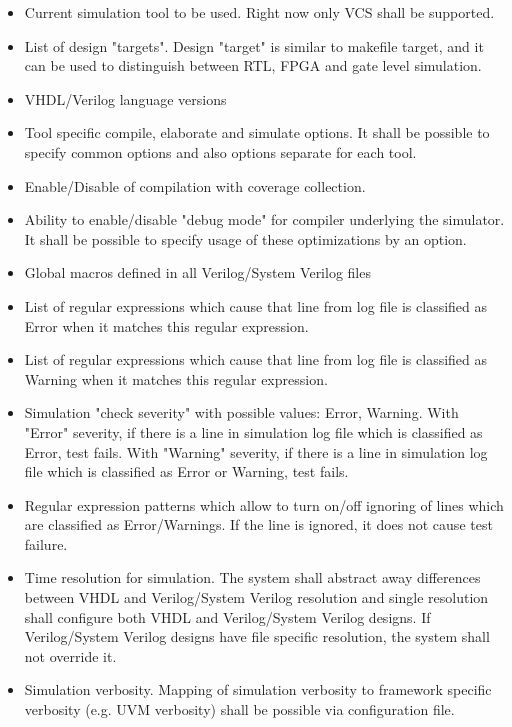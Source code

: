 \documentclass{tropic_design_spec}
\begin{document}
\begin{itemize}
    \item{Current simulation tool to be used. Right now only VCS shall be supported.}
    \item{List of design "targets". Design "target" is similar to makefile target, and
          it can be used to distinguish between RTL, FPGA and gate level simulation.}	
    \item{VHDL/Verilog language versions}
    \item{Tool specific compile, elaborate and simulate options. It shall be possible
          to specify common options and also options separate for each tool.}
    \item{Enable/Disable of compilation with coverage collection.}
    \item{Ability to enable/disable "debug mode" for compiler underlying the simulator.
          It shall be possible to specify usage of these optimizations by an option.}
	\item{Global macros defined in all Verilog/System Verilog files}
	\item{List of regular expressions which cause that line from log file is classified
	      as Error when it matches this regular expression.}
	\item{List of regular expressions which cause that line from log file is classified
	      as Warning when it matches this regular expression.}
	\item{Simulation "check severity" with possible values: Error, Warning. With "Error"
	      severity, if there is a line in simulation log file which is classified as
	      Error, test fails. With "Warning" severity, if there is a line in simulation
	      log file which is classified as Error or Warning, test fails.}
    \item{Regular expression patterns which allow to turn on/off ignoring of lines which
          are classified as Error/Warnings. If the line is ignored, it does not cause
          test failure.}
    \item{Time resolution for simulation. The system shall abstract away differences
          between VHDL and Verilog/System Verilog resolution and single resolution shall
          configure both VHDL and Verilog/System Verilog designs. If Verilog/System
          Verilog designs have file specific resolution, the system shall not override
          it.}
    \item{Simulation verbosity. Mapping of simulation verbosity to framework specific
          verbosity (e.g. UVM verbosity) shall be possible via configuration file.}
\end{itemize}
\end{document}
